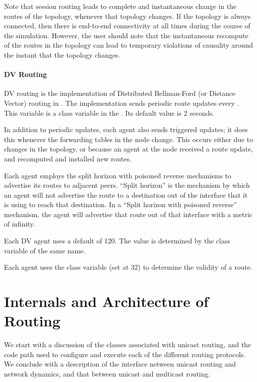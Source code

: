 Note that session routing leads to complete and instantaneous change
in the routes of the topology, whenever that topology changes.
If the topology is always connected, then there is
end-to-end connectivity at all times during the course of the simulation.
However, the user should note that the instantaneous recompute of the
routes in the topology can lead to temporary violations of causality
around the instant that the topology changes.

\paragraph{DV Routing}
DV routing is the implementation of
Distributed Bellman-Ford (or Distance Vector) routing in \ns.
The implementation sends periodic route updates every .
This variable is a class variable in the .
Its default value is 2 seconds.

In addition to periodic updates, each agent also sends triggered updates;
it does this whenever the forwarding tables in the node change.
This occurs either due to changes in the topology, 
or because an agent at the node received a route update,
and recomputed and installed new routes.

Each agent employs the split horizon with poisoned reverse mechanisms
to advertise its routes to adjacent peers.
``Split horizon'' is the mechanism by which an agent will not advertise
the route to a destination out of the interface that it is using to
reach that destination.
In a ``Split horizon with poisoned reverse'' mechanism,
the agent will advertise that route out of that interface with 
a metric of infinity.

Each DV agent uses a default  of 120.
The value is determined by the class variable of the same name.

Each agent uses the class variable  (set at 32)
to determine the validity of a route.

\section{Internals and Architecture of Routing}
\label{sec:rtg-internals}

We start with a discussion of the classes associated with
unicast routing, and the code path used to configure and execute
each of the different routing protocols.
We conclude with a description of
the interface netween unicast routing and network dynamics, and
that between unicast and multicast routing.

